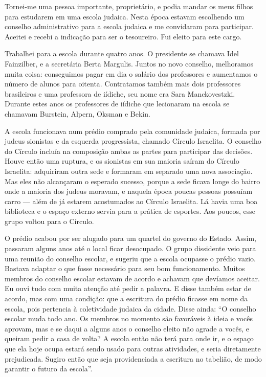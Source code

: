 Tornei-me uma pessoa importante, proprietário, e podia mandar os meus
filhos para estudarem em uma escola judaica. Nesta época estavam
escolhendo um conselho administrativo para a escola judaica e me
convidaram para participar. Aceitei e recebi a indicação para ser o
tesoureiro. Fui eleito para este cargo. 

Trabalhei para a escola durante
quatro anos. O presidente se chamava Idel Fainzilber, e a secretária
Berta Margulis. Juntos no novo conselho, melhoramos muita coisa:
conseguimos pagar em dia o salário dos professores e aumentamos o número
de alunos para oitenta. Contratamos também mais dois professores brasileiros e uma
professora de iídiche, seu nome era Sara Manckovestzki. Durante estes
anos os professores de iídiche que lecionaram na escola se chamavam
Burstein, Alpern, Oksman e Bekin.

A escola funcionava num prédio comprado pela comunidade judaica, formada por 
judeus sionistas e da esquerda progressista, chamado
Círculo Israelita.  O conselho do Círculo incluía na composição ambas
as partes para participar das decisões. Houve então uma ruptura, e os
sionistas em sua maioria saíram do Círculo Israelita: adquiriram outra
sede e formaram em separado uma nova associação. Mas eles não alcançaram
o esperado sucesso, porque a sede ficava longe do bairro onde a maioria
dos judeus moravam, e naquela época poucas pessoas possuíam carro --- além de já
estarem acostumados ao Círculo Israelita. Lá havia uma boa
biblioteca e o espaço externo servia para a prática de
esportes. Aos poucos, esse grupo voltou para o Círculo.

O prédio acabou por ser alugado para um quartel do governo do Estado. Assim, passaram
alguns anos até o local ficar desocupado. O grupo dissidente veio para
uma reunião do conselho escolar, e sugeriu que a escola 
ocupasse o prédio vazio. Bastava adaptar o que fosse necessário
para seu bom funcionamento. Muitos membros do conselho escolar
estavam de acordo e achavam que devíamos aceitar. Eu ouvi
tudo com muita atenção até pedir a palavra. E disse também estar de acordo, mas com uma condição: que a escritura do prédio ficasse em nome da escola, pois pertencia à 
coletividade judaica da cidade. Disse ainda: ``O conselho escolar muda todo ano. Os membros no momento são favoráveis à ideia e vocês aprovam, mas e se daqui a alguns anos o conselho eleito não agrade a vocês, e queiram pedir a casa de volta? A escola então não terá para onde ir, e o espaço que ela hoje ocupa estará sendo usado para outras atividades, e seria diretamente 
prejudicada. Sugiro então que seja providenciada a escritura no tabelião,
de modo garantir o futuro da escola''.

